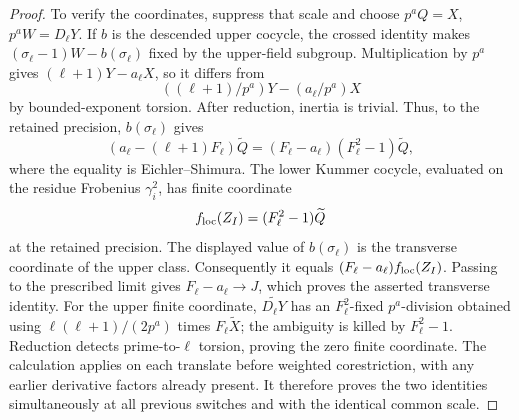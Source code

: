\begin{proof}
To verify the coordinates, suppress that scale and choose
\(p^aQ=X\), \(p^aW=D_\ell Y\).  If \(b\) is the descended upper
cocycle, the crossed identity makes
\((\sigma_\ell-1)W-b(\sigma_\ell)\) fixed by the upper-field
subgroup.  Multiplication by \(p^a\) gives
\((\ell+1)Y-a_\ell X\), so it differs from
\[
 ((\ell+1)/p^a)Y-(a_\ell/p^a)X
\]
by bounded-exponent torsion.  After reduction, inertia is trivial.
Thus, to the retained precision, \(b(\sigma_\ell)\) gives
\[
 (a_\ell-(\ell+1)F_\ell)\widetilde Q
       =(F_\ell-a_\ell)(F_\ell^2-1)\widetilde Q,
\]
where the equality is Eichler--Shimura.  The lower Kummer cocycle,
evaluated on the residue Frobenius \(\gamma_i^2\), has finite
coordinate
\[
 f_{\rm loc}(Z_I)=(F_\ell^2-1)\widetilde Q
\]
at the retained precision.  The displayed value of
\(b(\sigma_\ell)\) is the transverse coordinate of the upper class.
Consequently it equals
\((F_\ell-a_\ell)f_{\rm loc}(Z_I)\).
Passing to the prescribed limit gives \(F_\ell-a_\ell\to J\),
which proves the asserted transverse identity.
For the upper finite coordinate,
\(\widetilde{D_\ell Y}\) has an \(F_\ell^2\)-fixed
\(p^a\)-division obtained using
\(\ell(\ell+1)/(2p^a)\) times \(F_\ell\widetilde X\);
the ambiguity is killed by \(F_\ell^2-1\).  Reduction detects
prime-to-\(\ell\) torsion, proving the zero finite coordinate.
The calculation applies on each translate before weighted
corestriction, with any earlier derivative factors already present.
It therefore proves the two identities simultaneously at all
previous switches and with the identical common scale.
\end{proof}

